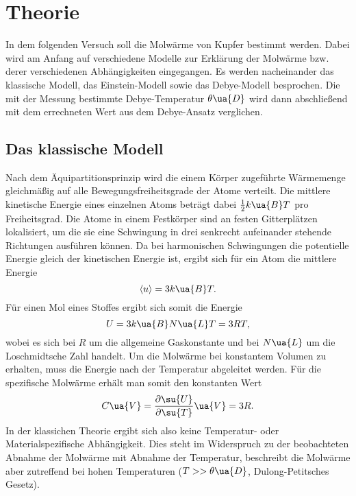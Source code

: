 \section{Theorie}

In dem folgenden Versuch soll die Molwärme von Kupfer bestimmt werden. Dabei wird
am Anfang auf verschiedene Modelle zur Erklärung der Molwärme bzw. derer verschiedenen
Abhängigkeiten eingegangen. Es werden nacheinander das klassische Modell, das Einstein-Modell
sowie das Debye-Modell besprochen. Die mit der Messung bestimmte Debye-Temperatur
$\theta\ua{D}$ wird dann abschließend mit dem errechneten Wert aus dem Debye-Ansatz
verglichen.

\subsection{Das klassische Modell}

Nach dem Äquipartitionsprinzip wird die einem Körper zugeführte Wärmemenge
gleichmäßig auf alle Bewegungsfreiheitsgrade der Atome verteilt. Die mittlere kinetische
Energie eines einzelnen Atoms beträgt dabei $\frac{1}{2}k\ua{B}T$ pro Freiheitsgrad. Die Atome in
einem Festkörper sind an festen Gitterplätzen lokalisiert, um die sie eine Schwingung
in drei senkrecht aufeinander stehende Richtungen ausführen können. Da bei harmonischen
Schwingungen die potentielle Energie gleich der kinetischen Energie ist, ergibt
sich für ein Atom die mittlere Energie
\begin{equation}
  \langle u \rangle = 3 k\ua{B} T.
\end{equation}
Für einen Mol eines Stoffes ergibt sich somit die Energie
\begin{equation}
  U = 3 k\ua{B} N\ua{L} T = 3 RT,
\end{equation}
wobei es sich bei $R$ um die allgemeine Gaskonstante und bei $N\ua{L}$ um die
Loschmidtsche Zahl handelt. Um die Molwärme bei konstantem Volumen zu erhalten,
muss die Energie nach der Temperatur abgeleitet werden. Für die spezifische Molwärme
erhält man somit den konstanten Wert
\begin{equation}
  C\ua{V} = \frac{\partial \su{U}}{\partial \su{T}}\ua{V} = 3R.
  \label{eqn:CVKlassisch}
\end{equation}
In der klassichen Theorie ergibt sich also keine Temperatur- oder Materialspezifische
Abhängigkeit. Dies steht im Widerspruch zu der beobachteten Abnahme der Molwärme
mit Abnahme der Temperatur, beschreibt die Molwärme aber zutreffend bei hohen Temperaturen
($T >> \theta\ua{D}$, Dulong-Petitsches Gesetz).

